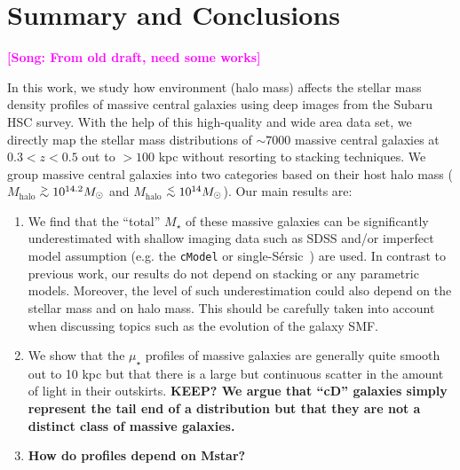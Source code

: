 \documentclass[a4paper,fleqn,usenatbib]{mnras}
\def\simlt{\lower.5ex\hbox{$\; \buildrel < \over {\sim} \;$}}
\def\simgt{\lower.5ex\hbox{$\; \buildrel > \over {\sim} \;$}}
\def\ser{{S\'{e}rsic\ }}
\def\mstar{{$M_{\star}$}}
\def\mhalo{{$M_{\mathrm{halo}}$}}
\def\mden{{$\mu_{\star}$}}
\newcommand{\song}[1]{\textcolor{magenta}{\textbf{[Song: #1]}}}
\begin{document}
\section{Summary and Conclusions}
    \label{sec:summary}

    \song{From old draft, need some works}
    
    In this work, we study how environment (halo mass) affects the stellar mass density 
    profiles of massive central galaxies using deep images from the Subaru HSC 
    survey. 
    With the help of this high-quality and wide area data set, we directly map the 
    stellar mass distributions of ${\sim}7000$ massive central galaxies at 
    $0.3 < z < 0.5$ out to $>100$ kpc without resorting to stacking techniques. 
    We group massive central galaxies into two categories based on their host halo 
    mass (\mhalo{}$\simgt 10^{14.2} M_{\odot}$ and \mhalo{}$\simlt 10^{14} M_{\odot}$). 
    Our main results are:  
    
    \begin{enumerate}
        \item We find that the ``total'' \mstar{} of these massive galaxies can be 
            significantly underestimated with shallow imaging data such as SDSS and/or 
            imperfect model assumption (e.g. the \texttt{cModel} or single-\ser{}) 
            are used. 
            In contrast to previous work, our results do not depend on stacking or any 
            parametric models. 
            Moreover, the level of such underestimation could also depend on the 
            stellar mass and on halo mass. 
            This should be carefully taken into account when discussing topics such 
            as the evolution of the galaxy SMF.
            
        \item We show that the \mden{} profiles of massive galaxies are generally quite 
            smooth out to 10 kpc but that there is a large but continuous scatter in the 
            amount of light in their outskirts. 
            {\bf KEEP? We argue that ``cD'' galaxies simply represent the tail end of a 
            distribution but that they are not a distinct class of massive galaxies.}
            
        \item {\bf How do profiles depend on Mstar?}
            
    \end{enumerate}
\end{document}
